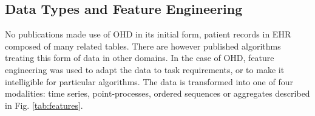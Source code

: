  \subsection{Data Types and Feature Engineering}
    No publications made use of OHD in its initial form, patient records in EHR composed of many related tables. There are however published algorithms treating this form of data in other domains. \todo In the case of OHD, feature engineering was used to adapt the data to task requirements, or to make it intelligible for particular algorithms. The data is transformed into one of four modalities: time series, point-processes, ordered sequences or aggregates described in Fig. \ref{tab:features}.
    
    
